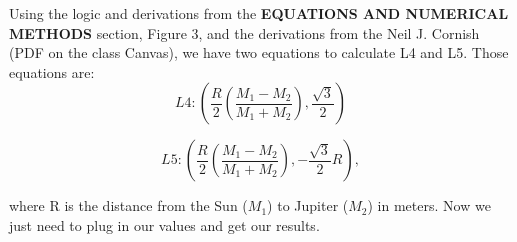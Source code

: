 \documentclass[linenumbers,RNAAS,trackchanges]{aastex631}
\begin{document}
    Using the logic and derivations from the \textbf{EQUATIONS AND NUMERICAL METHODS} section, Figure 3, and the derivations from the Neil J. Cornish (PDF on the class Canvas), we have two equations to calculate L4 and L5. Those equations are:
    \begin{equation}
        L4: \left(\frac{R}{2} \left(\frac{M_1 - M_2}{M_1 + M_2} \right), \frac{\sqrt{3}}{2}   \right)
        \label{eq: L4} \tag{4}
    \end{equation}
    
    \begin{equation}
        L5: \left(\frac{R}{2} \left(\frac{M_1 - M_2}{M_1 + M_2} \right), -\frac{\sqrt{3}}{2} R  \right)
        \label{eq: L5} \tag{5},
    \end{equation}
    
    \noindent
    where R is the distance from the Sun ($M_1$) to Jupiter ($M_2$) in meters. Now we just need to plug in our values and get our results.
    
    

\end{document}
